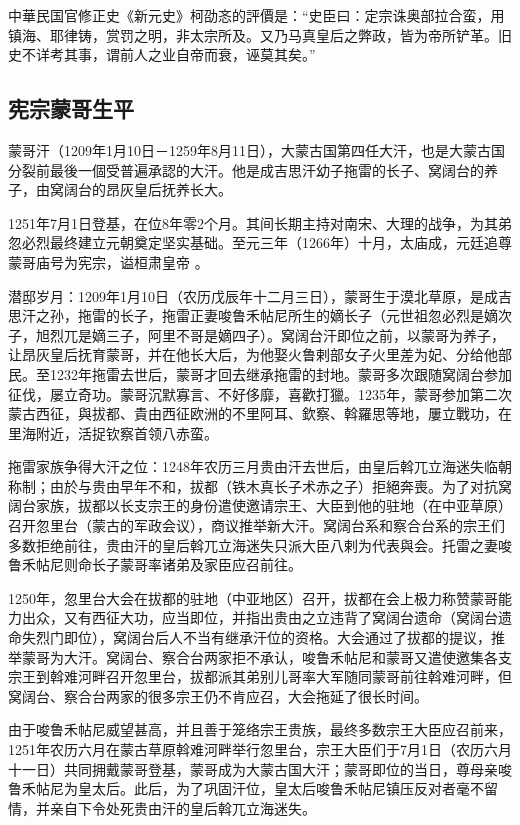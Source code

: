 中華民国官修正史《新元史》柯劭忞的評價是：“史臣曰：定宗诛奥部拉合蛮，用镇海、耶律铸，赏罚之明，非太宗所及。又乃马真皇后之弊政，皆为帝所铲革。旧史不详考其事，谓前人之业自帝而衰，诬莫其矣。” 

\subsection{宪宗蒙哥生平}

蒙哥汗（1209年1月10日－1259年8月11日），大蒙古国第四任大汗，也是大蒙古国分裂前最後一個受普遍承認的大汗。他是成吉思汗幼子拖雷的长子、窝阔台的养子，由窝阔台的昂灰皇后抚养长大。

1251年7月1日登基，在位8年零2个月。其间长期主持对南宋、大理的战争，为其弟忽必烈最终建立元朝奠定坚实基础。至元三年（1266年）十月，太庙成，元廷追尊蒙哥庙号为宪宗，谥桓肃皇帝 。

潜邸岁月：1209年1月10日（农历戊辰年十二月三日），蒙哥生于漠北草原，是成吉思汗之孙，拖雷的长子，拖雷正妻唆鲁禾帖尼所生的嫡长子（元世祖忽必烈是嫡次子，旭烈兀是嫡三子，阿里不哥是嫡四子）。窝阔台汗即位之前，以蒙哥为养子，让昂灰皇后抚育蒙哥，并在他长大后，为他娶火鲁剌部女子火里差为妃、分给他部民。至1232年拖雷去世后，蒙哥才回去继承拖雷的封地。蒙哥多次跟随窝阔台参加征伐，屡立奇功。蒙哥沉默寡言、不好侈靡，喜歡打獵。1235年，蒙哥参加第二次蒙古西征，與拔都、貴由西征欧洲的不里阿耳、欽察、斡羅思等地，屢立戰功，在里海附近，活捉钦察首领八赤蛮。

拖雷家族争得大汗之位：1248年农历三月贵由汗去世后，由皇后斡兀立海迷失临朝称制；由於与贵由早年不和，拔都（铁木真长子术赤之子）拒絕奔喪。为了对抗窝阔台家族，拔都以长支宗王的身份遣使邀请宗王、大臣到他的驻地（在中亚草原）召开忽里台（蒙古的军政会议），商议推举新大汗。窝阔台系和察合台系的宗王们多数拒绝前往，贵由汗的皇后斡兀立海迷失只派大臣八剌为代表與会。托雷之妻唆鲁禾帖尼则命长子蒙哥率诸弟及家臣应召前往。

1250年，忽里台大会在拔都的驻地（中亚地区）召开，拔都在会上极力称赞蒙哥能力出众，又有西征大功，应当即位，并指出贵由之立违背了窝阔台遗命（窝阔台遗命失烈门即位），窝阔台后人不当有继承汗位的资格。大会通过了拔都的提议，推举蒙哥为大汗。窝阔台、察合台两家拒不承认，唆鲁禾帖尼和蒙哥又遣使邀集各支宗王到斡难河畔召开忽里台，拔都派其弟别儿哥率大军随同蒙哥前往斡难河畔，但窝阔台、察合台两家的很多宗王仍不肯应召，大会拖延了很长时间。

由于唆鲁禾帖尼威望甚高，并且善于笼络宗王贵族，最终多数宗王大臣应召前来，1251年农历六月在蒙古草原斡难河畔举行忽里台，宗王大臣们于7月1日（农历六月十一日）共同拥戴蒙哥登基，蒙哥成为大蒙古国大汗；蒙哥即位的当日，尊母亲唆鲁禾帖尼为皇太后。此后，为了巩固汗位，皇太后唆鲁禾帖尼镇压反对者毫不留情，并亲自下令处死贵由汗的皇后斡兀立海迷失。

